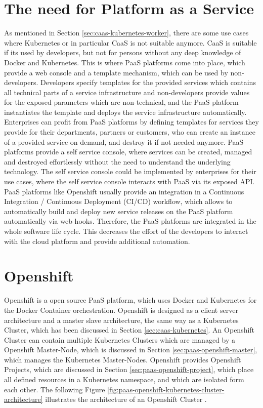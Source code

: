 \section{The need for Platform as a Service}
\label{sec:paas-need-for-paas}
As mentioned in Section \vref{sec:caas-kubernetes-worker}, there are some use cases where Kubernetes or in particular CaaS is not suitable anymore. CaaS is suitable if its used by developers, but not for persons without any deep knowledge of Docker and Kubernetes. This is where PaaS platforms come into place, which provide a web console and a template mechanism, which can be used by non-developers. Developers specify templates for the provided services which contains all technical parts of a service infrastructure and non-developers provide values for the exposed parameters which are non-technical, and the PaaS platform instantiates the template and deploys the service infrastructure automatically. \\

Enterprises can profit from PaaS platforms by defining templates for services they provide for their departments, partners or customers, who can create an instance of a provided service on demand, and destroy it if not needed anymore. PaaS platforms provide a self service console, where services can be created, managed and destroyed effortlessly without the need to understand the underlying technology. The self service console could be implemented by enterprises for their use cases, where the self service console interacts with PaaS via its exposed API. \\

PaaS platforms like Openshift usually provide an integration in a Continuous Integration / Continuous Deployment (CI/CD) workflow, which allows to automatically build and deploy new service releases on the PaaS platform automatically via web hooks. Therefore, the PaaS platforms are integrated in the whole software life cycle. This decreases the effort of the developers to interact with the cloud platform and provide additional automation.
 
\section{Openshift}
\label{sec:paas-kubernetes}
Openshift is a open source PaaS platform, which uses Docker and Kubernetes for the Docker Container orchestration. Openshift is designed as a client server architecture and a master slave architecture, the same way as a Kubernetes Cluster, which has been discussed in Section \vref{sec:caas-kubernetes}. An Openshift Cluster can contain multiple Kubernetes Clusters which are managed by a Openshift Master-Node, which is discussed in Section \vref{sec:paas-openshift-master}, which manages the Kubernetes Master-Nodes. Openshift provides Openshift Projects, which are discussed in Section \vref{sec:paas-openshift-project}, which place all defined resources in a Kubernetes namespace, and which are isolated form each other. The following Figure \vref{fig:paas-openshift-kubernetes-cluster-architecture} illustrates the architecture of an Openshift Cluster \cite{OpenshiftDeepDive2014, OpenshiftCoreConcepts2018}.

